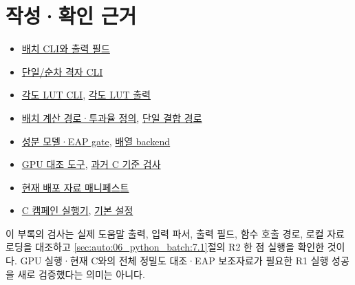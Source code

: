 \section{작성·확인 근거}
\label{sec:auto:06_python_batch:11}
\begin{itemize}
\item \href{https://github.com/brtnt/OCRT/blob/54861c68e35ec5aaa3938fad53e93dc2dfa7eb1d/code/OCRT_Python/produce_grid.py}{배치 CLI와 출력 필드}
\item \href{https://github.com/brtnt/OCRT/blob/54861c68e35ec5aaa3938fad53e93dc2dfa7eb1d/code/OCRT_Python/ocrt_solve.py}{단일/순차 격자 CLI}
\item \href{https://github.com/brtnt/OCRT/blob/54861c68e35ec5aaa3938fad53e93dc2dfa7eb1d/code/OCRT_Python/ocrt_fullgrid.py}{각도 LUT CLI}, \href{https://github.com/brtnt/OCRT/blob/54861c68e35ec5aaa3938fad53e93dc2dfa7eb1d/code/OCRT_Python/ocrt_py/lut.py}{각도 LUT 출력}
\item \href{https://github.com/brtnt/OCRT/blob/54861c68e35ec5aaa3938fad53e93dc2dfa7eb1d/code/OCRT_Python/ocrt_py/batch_driver.py}{배치 계산 경로·투과율 정의}, \href{https://github.com/brtnt/OCRT/blob/54861c68e35ec5aaa3938fad53e93dc2dfa7eb1d/code/OCRT_Python/ocrt_py/driver.py}{단일 결합 경로}
\item \href{https://github.com/brtnt/OCRT/blob/54861c68e35ec5aaa3938fad53e93dc2dfa7eb1d/code/OCRT_Python/ocrt_py/constituent.py}{성분 모델·EAP gate}, \href{https://github.com/brtnt/OCRT/blob/54861c68e35ec5aaa3938fad53e93dc2dfa7eb1d/code/OCRT_Python/ocrt_py/backend.py}{배열 backend}
\item \href{https://github.com/brtnt/OCRT/blob/54861c68e35ec5aaa3938fad53e93dc2dfa7eb1d/code/OCRT_Python/gpu_gate.py}{GPU 대조 도구}, \href{https://github.com/brtnt/OCRT/blob/54861c68e35ec5aaa3938fad53e93dc2dfa7eb1d/code/OCRT_Python/verify.py}{과거 C 기준 검사}
\item \href{https://github.com/brtnt/OCRT/blob/54861c68e35ec5aaa3938fad53e93dc2dfa7eb1d/scripts/MIE_SHA256SUMS_data-v1.txt}{현재 배포 자료 매니페스트}
\item \href{https://github.com/brtnt/OCRT/blob/54861c68e35ec5aaa3938fad53e93dc2dfa7eb1d/code/campaign_runner/runner/run_campaign.py}{C 캠페인 실행기}, \href{https://github.com/brtnt/OCRT/blob/54861c68e35ec5aaa3938fad53e93dc2dfa7eb1d/code/campaign_runner/config/polarization_campaign_pssa_16core.json}{기본 설정}
\end{itemize}

이 부록의 검사는 실제 도움말 출력, 입력 파서, 출력 필드, 함수 호출 경로, 로컬 자료 로딩을 대조하고 \ref{sec:auto:06_python_batch:7.1}절의 R2 한 점 실행을 확인한 것이다. GPU 실행·현재 C와의 전체 정밀도 대조·EAP 보조자료가 필요한 R1 실행 성공을 새로 검증했다는 의미는 아니다.

